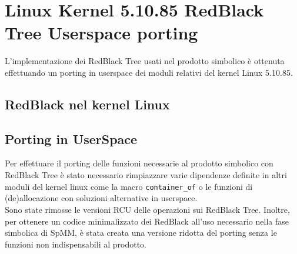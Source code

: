 \section{Linux Kernel 5.10.85 RedBlack Tree Userspace porting} \label{chSpMMAux:linuxRBTree}
L'implementazione dei RedBlack Tree usati nel prodotto simbolico è ottenuta effettuando un porting in 
userspace dei moduli relativi del kernel Linux 5.10.85.\\
\subsection{RedBlack nel kernel Linux}	%
\subsection{Porting in UserSpace}
Per effettuare il porting delle funzioni necessarie al prodotto simbolico con RedBlack Tree è stato necessario 
rimpiazzare varie dipendenze definite in altri moduli del kernel linux come la macro \verb|container_of| o le funzioni di (de)allocazione
con soluzioni alternative in userspace.\\
Sono state rimosse le versioni RCU delle operazioni sui RedBlack Tree.
Inoltre, per ottenere un codice minimalizzato dei RedBlack all'uso necessario nella fase simbolica di SpMM, 
è stata creata una versione ridotta del porting senza le funzioni non indispensabili al prodotto.
%

